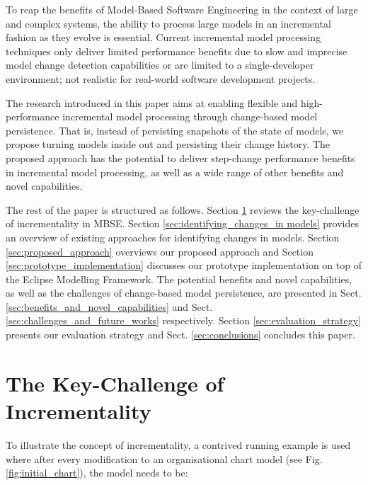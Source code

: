 \documentclass[conference]{IEEEtran}
\begin{document}

To reap the benefits of Model-Based Software Engineering in the context of large and complex systems, the ability to process large models in an incremental fashion as they evolve is essential. Current incremental model processing techniques only deliver limited performance benefits due to slow and imprecise model change detection capabilities or are limited to a single-developer environment; not realistic for real-world software development projects.

The research introduced in this paper aims at enabling flexible and high-performance incremental model processing through change-based model persistence. That is, instead of persisting snapshots of the state of models, we propose turning models inside out and persisting their change history. The proposed approach has the potential to deliver step-change performance benefits in incremental model processing, as well as a wide range of other benefits and novel capabilities.

The rest of the paper is structured as follows. Section \ref{sec:the_key_challenge_of_ _incrementality} reviews the key-challenge of incrementality in MBSE. Section \ref{sec:identifying_changes_in models} provides an overview of existing approaches for identifying changes in models. Section \ref{sec:proposed_approach} overviews our proposed approach and Section \ref{sec:prototype_implementation} discusses our prototype implementation on top of the Eclipse Modelling Framework. The potential benefits and novel capabilities, as well as the challenges of change-based model persistence, are presented in Sect. \ref{sec:benefits_and_novel_capabilities} and Sect. \ref{sec:challenges_and_future_works} respectively. Section \ref{sec:evaluation_strategy} presents our evaluation strategy and Sect. \ref{sec:conclusions} concludes this paper.

\section{The Key-Challenge of Incrementality}
\label{sec:the_key_challenge_of_ _incrementality}
To illustrate the concept of incrementality, a contrived running example is used where after every modification to an organisational chart model (see Fig. \ref{fig:initial_chart}), the model needs to be:
\end{document}
